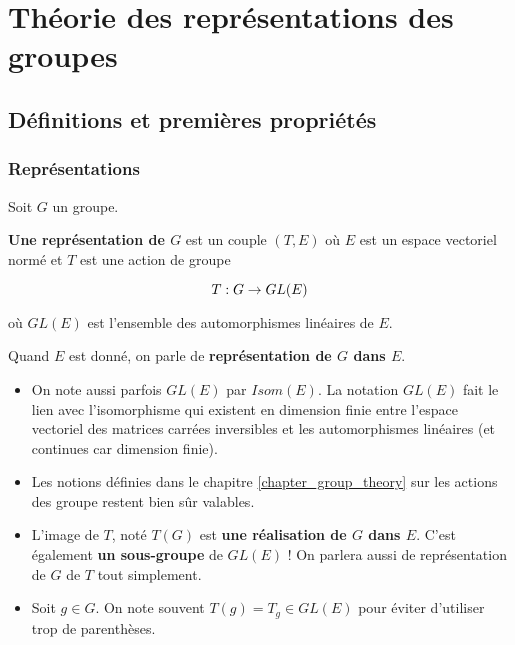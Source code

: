 \chapter{Théorie des représentations des groupes}

\section{Définitions et premières propriétés}

\subsection{Représentations}

\begin{definition}
	Soit $G$ un groupe.

	\textbf{Une représentation de $G$} est un couple $(T, E)$ où $E$
	est un espace vectoriel normé et $T$
	est une action de groupe

	\begin{equation}
		T : G \rightarrow GL(E)
		\label{definition_representation}
	\end{equation}

	où $GL(E)$ est l'ensemble des automorphismes linéaires de $E$.

	Quand $E$ est donné, on parle de \textbf{représentation de $G$ dans $E$}.
\end{definition}

\begin{remarque}
	\begin{itemize}
		\item On note aussi parfois $GL(E)$ par $Isom(E)$. La notation $GL(E)$ fait le
	lien avec l'isomorphisme qui existent en dimension finie entre l'espace
	vectoriel des matrices carrées inversibles et les automorphismes linéaires
	(et continues car dimension finie).

		\item Les notions définies dans le chapitre \ref{chapter_group_theory} sur les
	actions des groupe restent bien sûr valables.

		\item L'image de $T$, noté $T(G)$ est \textbf{une réalisation de $G$ dans $E$}.
	C'est également \textbf{un sous-groupe} de $GL(E)$ ! On parlera aussi de
	représentation de $G$ de $T$ tout simplement.

		\item Soit $g \in G$. On note souvent $T(g) = T_{g} \in GL(E)$ pour éviter
	d'utiliser trop de parenthèses.
	\end{itemize}
\end{remarque}


